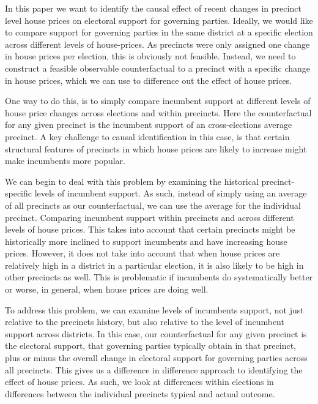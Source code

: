 \documentclass[12pt,a4paper]{article}
\begin{document}
In this paper we want to identify the causal effect of recent changes in precinct level house prices on electoral support for governing parties. Ideally, we would like to compare support for governing parties in the same district at a specific election across different levels of house-prices. As precincts were only assigned one change in house prices per election, this is obviously not feasible. Instead, we need to construct a feasible observable counterfactual to a precinct with a specific change in house prices, which we can use to difference out the effect of house prices. 

One way to do this, is to simply compare incumbent support at different levels of house price changes across elections and within precincts. Here the counterfactual for any given precinct is the incumbent support of an cross-elections average precinct. A key challenge to causal identification in this case, is that certain structural features of precincts in which house prices are likely to increase might make incumbents more popular. 

We can begin to deal with this problem by examining the historical precinct-specific levels of incumbent support. As such, instead of simply using an average of all precincts as our counterfactual, we can use the average for the individual precinct. Comparing incumbent support within precincts and across different levels of house prices. This takes into account that certain precincts might be historically more inclined to support incumbents and have increasing house prices. However, it does not take into account that when house prices are relatively high in a district in a particular election, it is also likely to be high in other precincts as well. This is problematic if incumbents do systematically better or worse, in general, when house prices are doing well.

To address this problem, we can examine levels of incumbents support, not just relative to the precincts history, but also relative to the level of incumbent support across districts. In this case, our counterfactual for any given precinct is the electoral support, that governing parties typically obtain in that precinct, plus or minus the overall change in electoral support for governing parties across all precincts. This gives us a difference in difference approach to identifying the effect of house prices. As such, we look at differences within elections in differences between the individual precincts typical and actual outcome.
\end{document}
